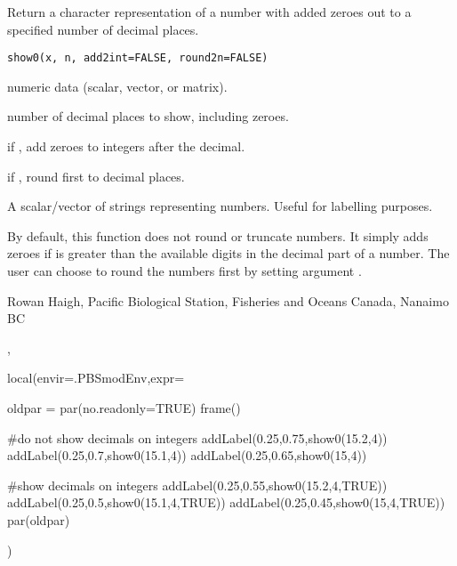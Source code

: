 \documentclass[letterpaper]{book}
\begin{document}
%
\begin{Description}\relax
Return a character representation of a number with added zeroes 
out to a specified number of decimal places.
\end{Description}
%
\begin{Usage}
\begin{verbatim}
show0(x, n, add2int=FALSE, round2n=FALSE)
\end{verbatim}
\end{Usage}
%
\begin{Arguments}
\begin{ldescription}
\item[\code{x}] numeric data (scalar, vector, or matrix).
\item[\code{n}] number of decimal places to show, including zeroes.
\item[\code{add2int}] if , add zeroes to integers after the decimal.
\item[\code{round2n}] if , round  first to  decimal places.
\end{ldescription}
\end{Arguments}
%
\begin{Value}
A scalar/vector of strings representing numbers. Useful for labelling purposes.
\end{Value}
%
\begin{Note}\relax
By default, this function does not round or truncate numbers. It simply adds zeroes if 
 is greater than the available digits in the decimal part of a number. The user can 
choose to round the numbers first by setting argument .
\end{Note}
%
\begin{Author}\relax
Rowan Haigh, Pacific Biological Station, Fisheries and Oceans Canada, Nanaimo BC
\end{Author}
%
\begin{SeeAlso}\relax
{}, 
\end{SeeAlso}
%
\begin{Examples}
\begin{ExampleCode}
local(envir=.PBSmodEnv,expr={
  oldpar = par(no.readonly=TRUE)
  frame()

  #do not show decimals on integers
  addLabel(0.25,0.75,show0(15.2,4))
  addLabel(0.25,0.7,show0(15.1,4))
  addLabel(0.25,0.65,show0(15,4))

  #show decimals on integers
  addLabel(0.25,0.55,show0(15.2,4,TRUE))
  addLabel(0.25,0.5,show0(15.1,4,TRUE))
  addLabel(0.25,0.45,show0(15,4,TRUE))
  par(oldpar)
})
\end{ExampleCode}
\end{Examples}
\end{document}
